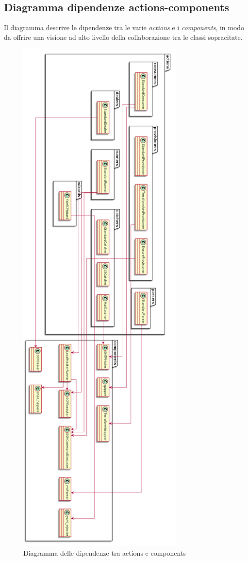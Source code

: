 \subsection{Diagramma dipendenze actions-components}
Il diagramma descrive le dipendenze tra le varie \textit{actions} e i \textit{components}, in modo da offrire una visione ad alto livello della collaborazione tra le classi sopracitate.
\begin{figure}[H]
	\centering
	\includegraphics[height=\textheight]{immagini/actionscomponents}
	\caption{Diagramma delle dipendenze tra actions e components}
	\label{img-actioncomponents}
\end{figure}
